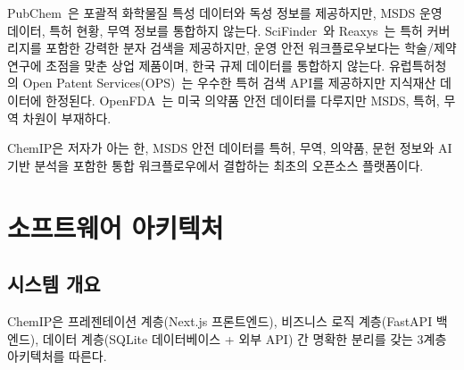 \documentclass[preprint,12pt]{elsarticle}
\begin{document}
PubChem~\cite{pubchem_2023}은 포괄적 화학물질 특성 데이터와 독성 정보를 제공하지만, MSDS 운영 데이터, 특허 현황, 무역 정보를 통합하지 않는다.
SciFinder~\cite{scifinder}와 Reaxys~\cite{reaxys}는 특허 커버리지를 포함한 강력한 분자 검색을 제공하지만, 운영 안전 워크플로우보다는 학술/제약 연구에 초점을 맞춘 상업 제품이며, 한국 규제 데이터를 통합하지 않는다.
유럽특허청의 Open Patent Services(OPS)~\cite{epo_ops}는 우수한 특허 검색 API를 제공하지만 지식재산 데이터에 한정된다.
OpenFDA~\cite{openfda}는 미국 의약품 안전 데이터를 다루지만 MSDS, 특허, 무역 차원이 부재하다.

ChemIP은 저자가 아는 한, MSDS 안전 데이터를 특허, 무역, 의약품, 문헌 정보와 AI 기반 분석을 포함한 통합 워크플로우에서 결합하는 최초의 오픈소스 플랫폼이다.

\section{소프트웨어 아키텍처}
\label{sec:architecture}

\subsection{시스템 개요}

ChemIP은 프레젠테이션 계층(Next.js 프론트엔드), 비즈니스 로직 계층(FastAPI 백엔드), 데이터 계층(SQLite 데이터베이스 + 외부 API) 간 명확한 분리를 갖는 3계층 아키텍처를 따른다.
\end{document}
